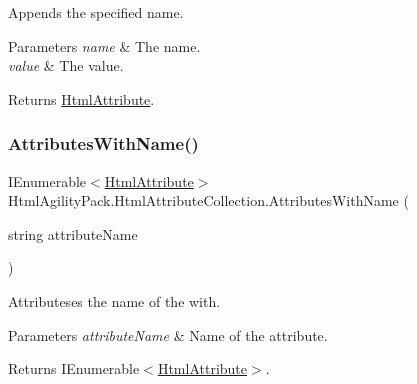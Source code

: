 Appends the specified name. 


\begin{DoxyParams}{Parameters}
{\em name} & The name.\\
\hline
{\em value} & The value.\\
\hline
\end{DoxyParams}
\begin{DoxyReturn}{Returns}
\hyperlink{class_html_agility_pack_1_1_html_attribute}{Html\+Attribute}.
\end{DoxyReturn}
\mbox{\label{class_html_agility_pack_1_1_html_attribute_collection_a99b74dd54d27471db627fcbb11ddc44a}} 
\subsubsection{\texorpdfstring{Attributes\+With\+Name()}{AttributesWithName()}}
{\footnotesize\ttfamily I\+Enumerable$<$\hyperlink{class_html_agility_pack_1_1_html_attribute}{Html\+Attribute}$>$ Html\+Agility\+Pack.\+Html\+Attribute\+Collection.\+Attributes\+With\+Name (\begin{DoxyParamCaption}\item[{string}]{attribute\+Name }\end{DoxyParamCaption})\hspace{0.3cm}{\ttfamily [inline]}}



Attributeses the name of the with. 


\begin{DoxyParams}{Parameters}
{\em attribute\+Name} & Name of the attribute.\\
\hline
\end{DoxyParams}
\begin{DoxyReturn}{Returns}
I\+Enumerable$<$\hyperlink{class_html_agility_pack_1_1_html_attribute}{Html\+Attribute}$>$.
\end{DoxyReturn}
\mbox{\label{class_html_agility_pack_1_1_html_attribute_collection_af24a94b022b18a5689798dad77675f80}} 
